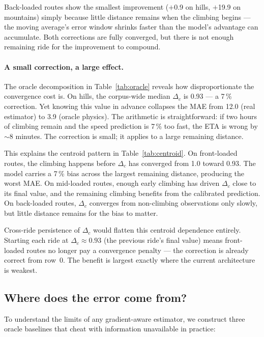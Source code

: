 \documentclass[11pt,a4paper]{article}
\begin{document}
Back-loaded routes show the smallest improvement ($+$0.9 on hills,
$+$19.9 on mountains) simply because little distance remains when
the climbing begins --- the moving average's error window shrinks
faster than the model's advantage can accumulate. Both corrections
are fully converged, but there is not enough remaining ride for the
improvement to compound.

\paragraph{A small correction, a large effect.}

The oracle decomposition in Table~\ref{tab:oracle} reveals how
disproportionate the convergence cost is. On hills, the corpus-wide
median $\Delta_c$ is 0.93 --- a 7\,\% correction. Yet knowing this
value in advance collapses the MAE from 12.0 (real estimator) to 3.9
(oracle physics). The arithmetic is straightforward: if two hours of
climbing remain and the speed prediction is 7\,\% too fast, the ETA is
wrong by $\sim$8 minutes. The correction is small; it applies to a
large remaining distance.

This explains the centroid pattern in Table~\ref{tab:centroid}. On
front-loaded routes, the climbing happens before $\Delta_c$ has
converged from 1.0 toward 0.93. The model carries a 7\,\% bias across
the largest remaining distance, producing the worst MAE. On mid-loaded
routes, enough early climbing has driven $\Delta_c$ close to its final
value, and the remaining climbing benefits from the calibrated
prediction. On back-loaded routes, $\Delta_c$ converges from
non-climbing observations only slowly, but little distance remains
for the bias to matter.

Cross-ride persistence of $\Delta_c$ would flatten this centroid
dependence entirely. Starting each ride at $\Delta_c \approx 0.93$
(the previous ride's final value) means front-loaded routes no longer
pay a convergence penalty --- the correction is already correct from
row~0. The benefit is largest exactly where the current architecture
is weakest.


\subsection{Where does the error come from?}
\label{sec:oracle}

To understand the limits of any gradient-aware estimator, we
construct three oracle baselines that cheat with information
unavailable in practice:
\end{document}
